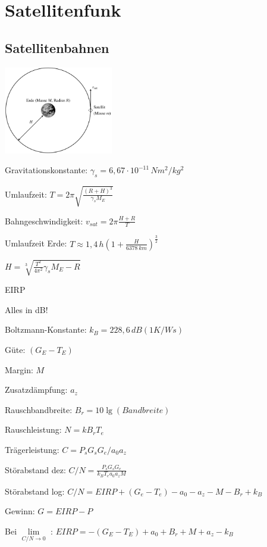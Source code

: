 \documentclass[german]{latex4ei/latex4ei_sheet}
\begin{document}
\section{Satellitenfunk}
    \begin{sectionbox}{\subsection{Satellitenbahnen}}
       \item \includegraphics[width=180px]{img/Satellitenumlauf.png}
       \item Gravitationskonstante: $\gamma_s = 6,67\cdot 10^{-11}\, Nm^2/kg^2$
       \item Umlaufzeit: $T = 2\pi \sqrt{\frac{(R+H)^3}{\gamma_s M_E}}$
       \item Bahngeschwindigkeit: $v_{sat} = 2\pi \frac{H+R}{T}$
       \item Umlaufzeit Erde: $T \approx 1,4\,h \left( 1+\frac{H}{6378\,km}\right)^{\frac{3}{2}}$
       \item $H = \sqrt[3]{\frac{T^2}{4\pi^2}\gamma_s M_E - R}$
    \end{sectionbox}
    \begin{sectionbox}{EIRP}
        \item Alles in dB!
        \item Boltzmann-Konstante: $k_B = 228,6\,dB(1K/Ws)$
        \item Güte: $(G_E-T_E)$ 
        \item Margin: $M$
        \item Zusatzdämpfung: $a_z$
        \item Rauschbandbreite: $B_r = 10 \lg(Bandbreite)$
        \item Rauschleistung: $N = kB_rT_e$
        \item Trägerleistung: $C = P_s G_s G_e/a_0 a_z$
        \item Störabstand dez: $C/N = \frac{P_s G_s G_e}{k_B T_e a_0 a_z M}$
        \item Störabstand log: $C/N = EIRP + (G_e-T_e)-a_0-a_z-M-B_r+k_B$
        \item Gewinn: $G = EIRP - P$
        \item Bei $\lim\limits_{C/N\rightarrow 0}$ : $EIRP = -(G_E-T_E) + a_0 + B_r + M + a_z - k_B$    
    \end{sectionbox}
\end{document}
